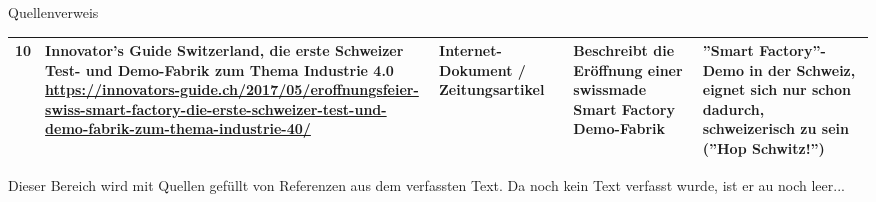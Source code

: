 \documentclass{article}
\begin{document}
\begin{Map}{Quellenverweis}
{\begin{tabular}{p{0.2cm}p{4.2cm}p{2cm}p{3.2cm}p{3.2cm}}
10&
Innovator's Guide Switzerland, die erste Schweizer Test- und Demo-Fabrik zum Thema Industrie 4.0 \url{https://innovators-guide.ch/2017/05/eroffnungsfeier-swiss-smart-factory-die-erste-schweizer-test-und-demo-fabrik-zum-thema-industrie-40/} &
Internet-Dokument / Zeitungsartikel & 
Beschreibt die Eröffnung einer swissmade Smart Factory Demo-Fabrik & 
''Smart Factory''-Demo in der Schweiz, eignet sich nur schon dadurch, schweizerisch zu sein (''Hop Schwitz!'') \\\bottomrule
\end{tabular}}
\medskip
{}
Dieser Bereich wird mit Quellen gefüllt von Referenzen aus dem verfassten Text. Da noch kein Text verfasst wurde, ist er au noch leer...
\begingroup
\renewcommand{\section}[2]{}%


\endgroup
\end{Map}
\end{document}
